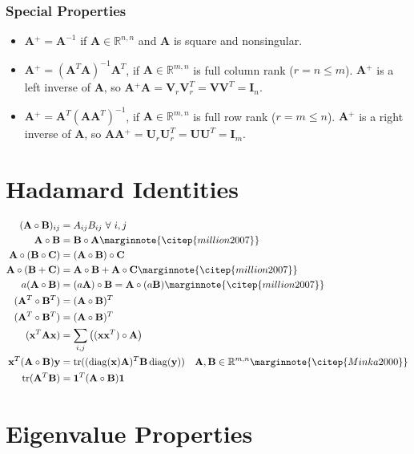 \documentclass{book}
\newcommand{\mA}{\mathbf{A}}
\newcommand{\mB}{\mathbf{B}}
\newcommand{\mC}{\mathbf{C}}
\newcommand{\mI}{\mathbf{I}}
\newcommand{\mU}{\mathbf{U}}
\newcommand{\mV}{\mathbf{V}}
\newcommand{\vx}{\mathbf{x}}
\newcommand{\vy}{\mathbf{y}}
\DeclareMathOperator{\diag}{diag}
\DeclareMathOperator{\trace}{tr}
\newcommand{\sRmn}{\mathbb{R}^{m,n}}
\newcommand{\sRnn}{\mathbb{R}^{n,n}}
\newcommand{\pinv}{\!^+}
\newcommand{\eqcite}[1]{\marginnote{\citep{#1}}}
\begin{document}
\subsection*{Special Properties}
\begin{itemize}
\item $\mA\pinv=\mA^{-1}$ if $\mA\in\sRnn$ and $\mA$ is square and nonsingular.
\item $\mA\pinv=(\mA^T\mA)^{-1}\mA^T$, if $\mA\in\sRmn$ is full column rank ($r=n\le m$). $\mA\pinv$ is a left inverse of $\mA$, so $\mA\pinv\mA=\mV_r\mV_r^T=\mV\mV^T=\mI_n$.
\item $\mA\pinv=\mA^T(\mA\mA^T)^{-1}$, if $\mA\in\sRmn$ is full row rank ($r=m\le n$). $\mA\pinv$ is a right inverse of $\mA$, so $\mA\mA\pinv=\mU_r\mU_r^T=\mU\mU^T=\mI_m$.
\end{itemize} %



\chapter{Hadamard Identities}

\begin{align}
(\mA\circ\mB)_{ij}    &= A_{ij}B_{ij}~\forall~i,j                                     \\
\mA\circ\mB           &= \mB\circ\mA                             \eqcite{million2007} \\
\mA\circ(\mB\circ\mC) &= (\mA\circ\mB)\circ\mC                                        \\
\mA\circ(\mB+\mC)     &= \mA\circ\mB+\mA\circ\mC                 \eqcite{million2007} \\
a(\mA\circ\mB)        &= (a\mA)\circ\mB =\mA\circ(a\mB)          \eqcite{million2007} \\
(\mA^T\circ\mB^T)     &= (\mA\circ\mB)^T                                              \\
(\mA^T\circ\mB^T)     &= (\mA\circ\mB)^T                                              \\
(\vx^T \mA \vx)       &= \sum_{i,j}\big((\vx \vx^T)\circ\mA\big)                      \\
\vx^T(\mA\circ\mB)\vy &= \trace((\diag(\vx)\mA)^T \mB\diag(\vy))~~~\mA,\mB\in\sRmn \eqcite{Minka2000}   \\
\trace(\mA^T\mB)      &= \mathbf{1}^T(\mA\circ\mB)\mathbf{1}                          
\end{align}


\chapter{Eigenvalue Properties}
\end{document}
